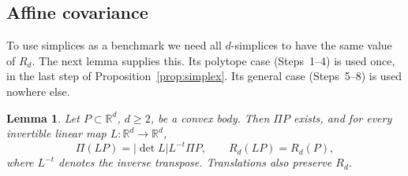 \documentclass[11pt]{article}
\newtheorem{lemma}[theorem]{Lemma}
\newcommand{\R}{\mathbb R}
\begin{document}
\subsection{Affine covariance}

To use simplices as a benchmark we need all \(d\)-simplices to have the
same value of \(R_d\). The next lemma supplies this. Its polytope case
(Steps~1--4) is used once, in the last step of
Proposition~\ref{prop:simplex}. Its general case (Steps~5--8) is used
nowhere else.

\begin{lemma}\label{lem:affine}
Let \(P\subset\R^d\), \(d\ge2\), be a convex body. Then \(\Pi P\) exists,
and for every invertible linear map \(L\colon\R^d\to\R^d\),
\[
 \Pi(LP)=|\det L|L^{-t}\Pi P,\qquad R_d(LP)=R_d(P),
\]
where \(L^{-t}\) denotes the inverse transpose. Translations also
preserve \(R_d\).
\end{lemma}
\end{document}
